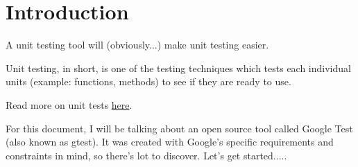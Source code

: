 \section{Introduction}

A unit testing tool will (obviously...) make unit testing easier.

Unit testing, in short, is one of the testing techniques which tests each
individual units (example: functions, methods) to see if they are ready
to use.

Read more on unit tests
\href{https://en.wikipedia.org/wiki/Unit_testing}{here}.

For this document, I will be talking about an open source tool called
Google Test (also known as gtest). It was created with Google's specific
requirements and constraints in mind, so there's lot to discover.
Let's get started.....

\newpage
